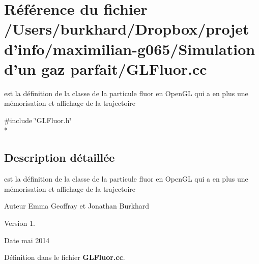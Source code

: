 \section{Référence du fichier /\+Users/burkhard/\+Dropbox/projet d'info/maximilian-\/g065/\+Simulation d'un gaz parfait/\+G\+L\+Fluor.cc}
\label{_g_l_fluor_8cc}


est la définition de la classe de la particule fluor en Open\+G\+L qui a en plus une mémorisation et affichage de la trajectoire  


{\ttfamily \#include \char`\"{}G\+L\+Fluor.\+h\char`\"{}}\\*


\subsection{Description détaillée}
est la définition de la classe de la particule fluor en Open\+G\+L qui a en plus une mémorisation et affichage de la trajectoire 

\begin{DoxyAuthor}{Auteur}
Emma Geoffray et Jonathan Burkhard 
\end{DoxyAuthor}
\begin{DoxyVersion}{Version}
1. 
\end{DoxyVersion}
\begin{DoxyDate}{Date}
mai 2014 
\end{DoxyDate}


Définition dans le fichier {\bf G\+L\+Fluor.\+cc}.

